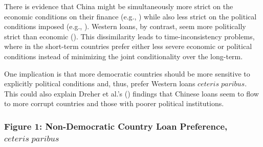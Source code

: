 \documentclass[12pt]{article}
\begin{document}
There is evidence that China might be simultaneously more strict on the economic conditions on their finance (e.g., \cite{dreher2018}) while also less strict on the political conditions imposed (e.g., \cite{dreher2018}). Western loans, by contrast, seem more politically strict than economic (\cite{hernandez2017}). This dissimilarity leads to time-inconsistency problems, where in the short-term countries prefer either less severe economic or political conditions instead of minimizing the joint conditionality over the long-term.


One implication is that more democratic countries should be more sensitive to explicitly political conditions and, thus, prefer Western loans $ceteris\;paribus$. This could also explain Dreher et al.'s (\citeyear{dreher2018}) findings that Chinese loans seem to flow to more corrupt countries and those with poorer political institutions.

\subsubsection*{Figure 1: Non-Democratic Country Loan Preference, $ceteris\;paribus$}
\end{document}
